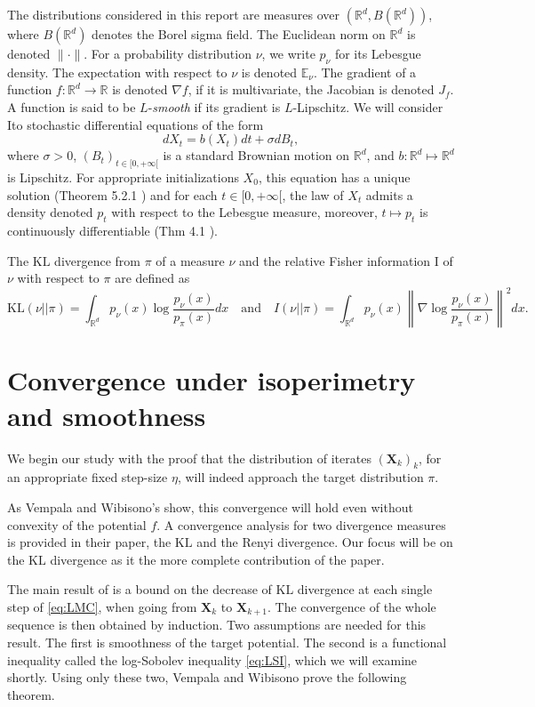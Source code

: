 \documentclass[11pt,twoside]{article}
\theoremstyle{definition}
\newcommand{\E}{\mathbb{E}}
\newcommand{\R}{\mathbb{R}}
\newcommand{\bX}{\mathbf{X}}
\newcommand{\KL}{\text{KL}}
\begin{document}
The distributions considered in this report are measures over $(\R^d, B(\R^d))$, where $B(\R^d)$ denotes the Borel sigma field. The Euclidean norm on $\R^d$ is denoted $\|\cdot\|$. For a probability distribution $\nu$, we write $p_\nu$ for its Lebesgue density. The expectation with respect to $\nu$ is denoted $\E_\nu$. The gradient of a function $f: \R^d \rightarrow \R$ is denoted $\nabla f$, if it is multivariate, the Jacobian is denoted $J_f$. A function is said to be $L$-\textit{smooth} if its gradient is $L$-Lipschitz. We will consider Ito stochastic differential equations of the form 
\[
dX_t =  b(X_t)dt + \sigma dB_t,
\]
where $\sigma > 0$, $(B_t)_{t\in [0, +\infty[}$ is a standard Brownian motion on $\R^d$, and $b: \R^d \mapsto \R^d$ is Lipschitz. For appropriate initializations $X_0$, this equation has a unique solution (Theorem 5.2.1 \cite{oksendal_stochastic_2003}) and for each $t\in [0, +\infty[$, the law of $X_t$ admits a density denoted $p_t$ with respect to the Lebesgue measure, moreover, $t \mapsto p_t$ is continuously differentiable (Thm 4.1 \cite{pavliotis_fokkerplanck_2014}). 

The $\KL$ divergence from $\pi$ of a measure $\nu$ and the relative Fisher information I of $\nu$ with respect to $\pi$ are defined as
\[
\KL(\nu || \pi) = \int_{\R^d} p_\nu(x)\log\frac{p_\nu(x)}{p_\pi(x)}dx \quad \text{and} \quad I(\nu || \pi) = \int_{\R^d} p_\nu(x)\left\|\nabla \log\frac{p_\nu(x)}{p_\pi(x)}\right\|^2dx.
\]

\section{Convergence under isoperimetry and smoothness}
\label{sec:vemp}
We begin our study with the proof that the distribution of iterates $(\bX_k)_k$, for an appropriate fixed step-size $\eta$, will indeed approach the target distribution $\pi$. 

As Vempala and Wibisono's show, this convergence will hold even without convexity of the potential $f$. A convergence analysis for two divergence measures is provided in their paper\cite{vempala_rapid_2019}, the $\KL$ and the Renyi divergence. Our focus will be on the $\KL$ divergence as it the more complete contribution of the paper.

The main result of \cite{vempala_rapid_2019} is a bound on the decrease of $\KL$ divergence at each single step of \eqref{eq:LMC}, when going from $\bX_k$ to $\bX_{k+1}$. The convergence of the whole sequence is then obtained by induction. Two assumptions are needed for this result. The first is smoothness of the target potential. The second is a functional inequality called the log-Sobolev inequality \eqref{eq:LSI}, which we will examine shortly. Using only these two, Vempala and Wibisono prove the following theorem. 
\end{document}
